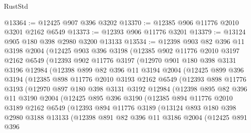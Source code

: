 \begin{lexlean}{RustStd}
\begin{coremodule}
@13364 := @12425 @907 @396 @3202
@13370 := @12385 @906 @11776 @2010 @3201 @2162 @6549
@13373 := @12393 @906 @11776 @3201
@13379 := @13124 @905 @180 @398 @2980 @3200 @13133
@13534 := @12398
    @903
    @82
    @396
    @11
    @3198
    @2004
    (@12425
      @903
      @396
      @3198
      (@12385
        @902
        @11776
        @2010
        @3197
        @2162
        @6549
        (@12393
          @902
          @11776
          @3197
          (@12970
            @901
            @180
            @398
            @3131
            @3196
            @12984
            (@12398
              @899
              @82
              @396
              @11
              @3194
              @2004
              (@12425
                @899
                @396
                @3194
                (@12385
                  @898
                  @11776
                  @2010
                  @3193
                  @2162
                  @6549
                  (@12393
                    @898
                    @11776
                    @3193
                    (@12970
                      @897
                      @180
                      @398
                      @3131
                      @3192
                      @12984
                      (@12398
                        @895
                        @82
                        @396
                        @11
                        @3190
                        @2004
                        (@12425
                          @895
                          @396
                          @3190
                          (@12385
                            @894
                            @11776
                            @2010
                            @3189
                            @2162
                            @6549
                            (@12393
                              @894
                              @11776
                              @3189
                              (@13124
                                @893
                                @180
                                @398
                                @2980
                                @3188
                                @13133
                                (@12398
                                  @891
                                  @82
                                  @396
                                  @11
                                  @3186
                                  @2004
                                  (@12425
                                    @891
                                    @396

\end{coremodule}
\end{lexlean}
